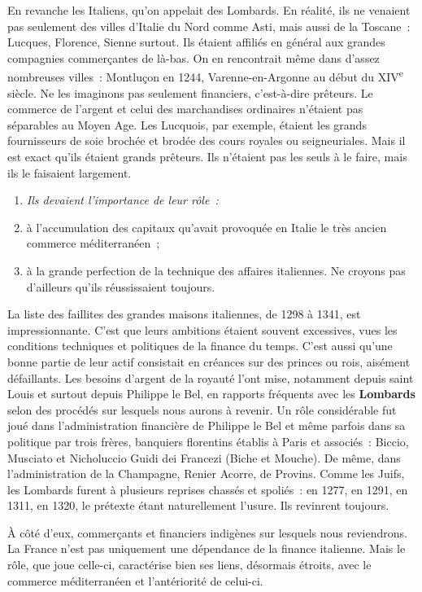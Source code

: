 \documentclass[french,twoside]{book} %
\newlength{\listmod}
\newcommand{\listhead}[1]{\hspace{-1\listmod}\emph{#1}}
\newcommand\term[1]{\textbf{#1}}
\begin{document}
En revanche les Italiens, qu’on appelait des Lombards. En réalité, ils ne venaient pas seulement des villes d’Italie du Nord comme Asti, mais aussi de la Toscane : Lucques, Florence, Sienne surtout. Ils étaient affiliés en général aux grandes compagnies commerçantes de là-bas. On en rencontrait même dans d’assez nombreuses villes : Montluçon en 1244, Varenne-en-Argonne au début du XIV\textsuperscript{e} siècle. Ne les imaginons pas seulement financiers, c’est-à-dire prêteurs. Le commerce de l’argent et celui des marchandises ordinaires n’étaient pas séparables au Moyen Age. Les Lucquois, par exemple, étaient les grands fournisseurs de soie brochée et brodée des cours royales ou seigneuriales. Mais il est exact qu’ils étaient  
\label{p89} grands prêteurs. Ils n’étaient pas les seuls à le faire, mais ils le faisaient largement.\par

\begin{enumerate}[itemsep=0pt,]
\item[]\listhead{Ils devaient l’importance de leur rôle :}
\item à l’accumulation des capitaux qu’avait provoquée en Italie le très ancien commerce méditerranéen ;
\item à la grande perfection de la technique des affaires italiennes. Ne croyons pas d’ailleurs qu’ils réussissaient toujours.
\end{enumerate}

\noindent La liste des faillites des grandes maisons italiennes, de 1298 à 1341, est impressionnante. C’est que leurs ambitions étaient souvent excessives, vues les conditions techniques et politiques de la finance du temps. C’est aussi qu’une bonne partie de leur actif consistait en créances sur des princes ou rois, aisément défaillants. Les besoins d’argent de la royauté l’ont mise, notamment depuis saint Louis et surtout depuis Philippe le Bel, en rapports fréquents avec les \term{Lombards} selon des procédés sur lesquels nous aurons à revenir. Un rôle considérable fut joué dans l’administration financière de Philippe le Bel et même parfois dans sa politique par trois frères, banquiers florentins établis à Paris et associés : Biccio, Musciato et Nicholuccio Guidi dei Francezi (Biche et Mouche). De même, dans l’administration de la Champagne, Renier Acorre, de Provins. Comme les Juifs, les Lombards furent à plusieurs reprises chassés et spoliés : en 1277, en 1291, en 1311, en 1320, le prétexte étant naturellement l’usure. Ils revinrent toujours.\par
À côté d’eux, commerçants et financiers indigènes sur lesquels nous reviendrons. La France n’est pas uniquement une dépendance de la finance italienne. Mais le rôle, que joue celle-ci, caractérise bien ses liens, désormais étroits, avec le commerce méditerranéen et l’antériorité de celui-ci.
\end{document}
